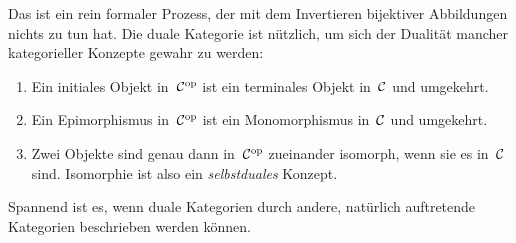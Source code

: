 Das ist ein rein formaler Prozess, der mit dem Invertieren bijektiver
Abbildungen nichts zu tun hat. Die duale Kategorie ist nützlich, um sich der
Dualität mancher kategorieller Konzepte gewahr zu werden:

\begin{bsp}\begin{enumerate}
\item Ein initiales Objekt in~$\mathcal{C}^{\mathrm{op}}$ ist ein terminales Objekt in~$\mathcal{C}$ und
umgekehrt.
\item Ein Epimorphismus in~$\mathcal{C}^{\mathrm{op}}$ ist ein Monomorphismus in~$\mathcal{C}$ und
umgekehrt.
\item Zwei Objekte sind genau dann in~$\mathcal{C}^{\mathrm{op}}$ zueinander isomorph, wenn sie es
in~$\mathcal{C}$ sind. Isomorphie ist also ein \emph{selbstduales} Konzept.
\end{enumerate}\end{bsp}

Spannend ist es, wenn duale Kategorien durch andere, natürlich
auftretende Kategorien beschrieben werden können.


